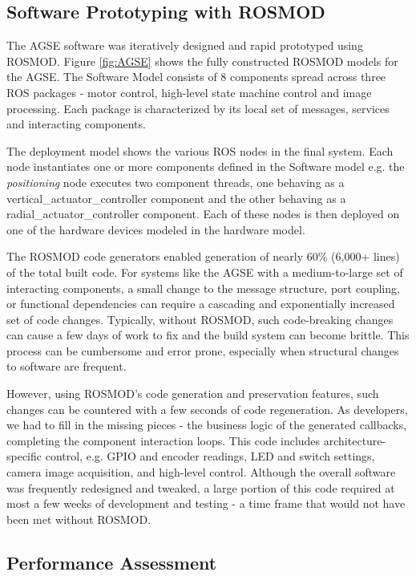 \subsection{Software Prototyping with ROSMOD}

The AGSE software \cite{AGSE} was iteratively designed and rapid prototyped using ROSMOD. Figure \ref{fig:AGSE} shows the fully constructed ROSMOD models for the AGSE. The Software Model consists of 8 components spread across three ROS packages - motor control, high-level state machine control and image processing. Each package is characterized by its local set of messages, services and interacting components. 

The deployment model shows the various ROS nodes in the final system. Each node instantiates one or more components defined in the Software model e.g. the \emph{positioning} node executes two component threads, one behaving as a vertical\_actuator\_controller component and the other behaving as a radial\_actuator\_controller component. Each of these nodes is then deployed on one of the hardware devices modeled in the hardware model.

The ROSMOD code generators enabled generation of nearly 60\% (6,000+ lines) of the total built code. For systems like the AGSE with a medium-to-large set of interacting components, a small change to the message structure, port coupling, or functional dependencies can require a cascading and exponentially increased set of code changes. Typically, without ROSMOD, such code-breaking changes can cause a few days of work to fix and the build system can become brittle. This process can be cumbersome and error prone, especially when structural changes to software are frequent.

However, using ROSMOD's code generation and preservation features, such changes can be countered with a few seconds of code regeneration. As developers, we had to fill in the missing pieces - the business logic of the generated callbacks, completing the component interaction loops. This code includes architecture-specific control, e.g. GPIO and encoder readings, LED and switch settings, camera image acquisition, and high-level control. Although the overall software was frequently redesigned and tweaked, a large portion of this code required at most a few weeks of development and testing - a time frame that would not have been met without ROSMOD. 

\subsection{Performance Assessment}

